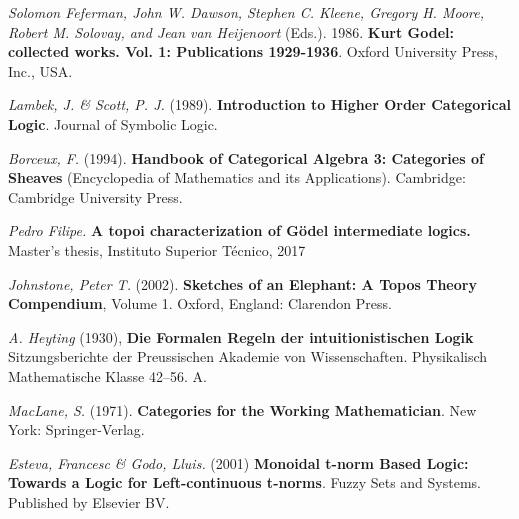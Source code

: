 \begin{thebibliography}{30}
	\emph{Solomon Feferman, John W. Dawson, Stephen C. Kleene, Gregory H. Moore, Robert M. Solovay, and Jean van Heijenoort} (Eds.). 1986. \textbf{Kurt Godel: collected works. Vol. 1: Publications 1929-1936}. Oxford University Press, Inc., USA.
	
	
	\emph{Lambek, J. \& Scott, P. J.} (1989). \textbf{Introduction to Higher Order Categorical Logic}. Journal of Symbolic Logic.
	
	\emph{Borceux, F.} (1994). \textbf{Handbook of Categorical Algebra 3: Categories of Sheaves} (Encyclopedia of Mathematics and its Applications). Cambridge: Cambridge University Press.
	
	\emph{Pedro Filipe.} \textbf{A topoi characterization of Gödel intermediate logics.} Master’s
	thesis, Instituto Superior Técnico, 2017
	
	\emph{Johnstone, Peter T.} (2002). \textbf{Sketches of an Elephant: A Topos Theory Compendium}, Volume 1. Oxford, England: Clarendon Press.
	
	\emph{A. Heyting} (1930), \textbf{Die Formalen Regeln der intuitionistischen Logik} Sitzungsberichte der Preussischen Akademie von Wissenschaften. Physikalisch Mathematische Klasse 42–56. A.
	
	\emph{MacLane, S.} (1971). \textbf{Categories for the Working Mathematician}. New York: Springer-Verlag.
	
	\emph{Esteva, Francesc \& Godo, Lluis.} (2001) \textbf{Monoidal t-norm Based Logic: Towards a Logic for Left-continuous t-norms}. Fuzzy Sets and Systems. Published by Elsevier BV. 
	
	
\end{thebibliography}



